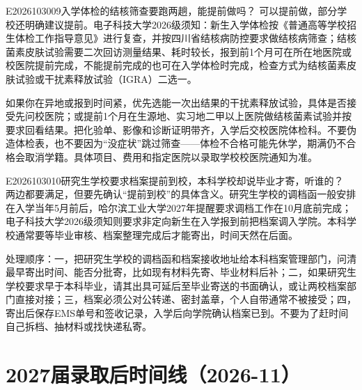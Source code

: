 \begin{qa}{E2026103009}{入学体检的结核筛查要跑两趟，能提前做吗？}
可以提前做，部分学校还明确建议提前。电子科技大学2026级须知：新生入学体检按《普通高等学校招生体检工作指导意见》进行复查，并按四川省结核病防控要求做结核病筛查；结核菌素皮肤试验需要二次回访测量结果、耗时较长，报到前1个月可在所在地医院或校医院提前完成，不能提前完成的也可在入学体检时完成，检查方式为结核菌素皮肤试验或干扰素释放试验（IGRA）二选一。

如果你在异地或报到时间紧，优先选能一次出结果的干扰素释放试验，具体是否接受先问校医院；或提前1个月在生源地、实习地二甲以上医院做结核菌素试验并按要求回看结果。把化验单、影像和诊断证明带齐，入学后交校医院体检科。不要伪造体检表，也不要因为“没症状”跳过筛查——体检不合格可能先休学，期满仍不合格会取消学籍。具体项目、费用和指定医院以录取学校校医院通知为准。
\end{qa}

\begin{qa}{E2026103010}{研究生学校要求档案提前到校，本科学校却说毕业才寄，听谁的？}
两边都要满足，但要先确认“提前到校”的具体含义。研究生学校的调档函一般安排在入学当年5月前后，哈尔滨工业大学2027年提醒要求调档工作在10月底前完成；电子科技大学2026级须知则要求非定向新生在入学报到前把档案调入学院。本科学校通常要等毕业审核、档案整理完成后才能寄出，时间天然在后面。

处理顺序：一，把研究生学校的调档函和档案接收地址给本科档案管理部门，问清最早寄出时间、能否分批寄，比如现有材料先寄、毕业材料后补；二，如果研究生学校要求早于本科毕业，请其出具可延后至毕业寄送的书面确认，或让两校档案部门直接对接；三，档案必须公对公转递、密封盖章，个人自带通常不被接受；四，寄出后保存EMS单号和签收记录，入学后向学院确认档案已到。不要为了赶时间自己拆档、抽材料或找快递私寄。
\end{qa}

\section{2027届录取后时间线（2026-11）}

